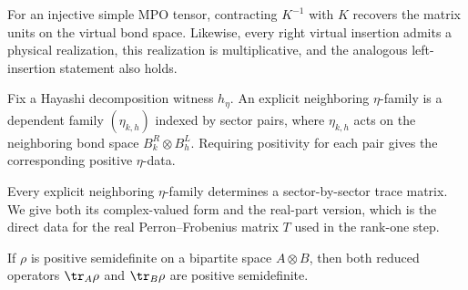 \begin{theorem}
    \label{thm:mpdo_injective_inverse_layer_spec}
    \leanok
    For an injective simple MPO tensor, contracting $K^{-1}$ with $K$ recovers
    the matrix units on the virtual bond space. Likewise, every right virtual
    insertion admits a physical realization, this realization is multiplicative,
    and the analogous left-insertion statement also holds.
\end{theorem}

\begin{definition}
    \label{def:mpdo_explicit_eta_operators}
    \leanok
    Fix a Hayashi decomposition witness $h_\eta$. An explicit neighboring
    $\eta$-family is a dependent family $(\eta_{k,h})$ indexed by sector pairs,
    where $\eta_{k,h}$ acts on the neighboring bond space
    $B_k^{R} \otimes B_h^{L}$. Requiring positivity for each pair gives the
    corresponding positive $\eta$-data.
\end{definition}

\begin{definition}
    \label{def:mpdo_explicit_eta_trace_matrix}
    \leanok
    Every explicit neighboring $\eta$-family determines a sector-by-sector trace
    matrix. We give both its complex-valued form and the real-part version,
    which is the direct data for the real Perron--Frobenius matrix $T$ used
    in the rank-one step.
\end{definition}


\begin{theorem}
    \label{thm:matrix_possemidef_partial_traces}
    \leanok
    If $\rho$ is positive semidefinite on a bipartite space $A \otimes B$, then
    both reduced operators $\tr_A \rho$ and $\tr_B \rho$ are positive
    semidefinite.
\end{theorem}

